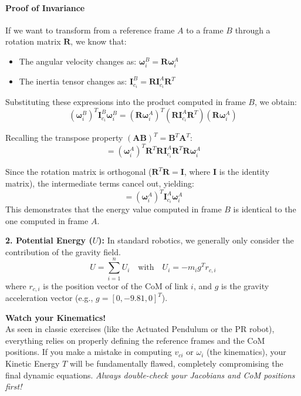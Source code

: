 \documentclass[11pt,a4paper]{article}
\begin{document}
\paragraph*{Proof of Invariance}
If we want to transform from a reference frame $A$ to a frame $B$ through a rotation matrix $\boldsymbol{R}$, we know that:
\begin{itemize}
    \item The angular velocity changes as: $\boldsymbol{\omega}_i^B = \boldsymbol{R} \boldsymbol{\omega}_i^A$
    \item The inertia tensor changes as: $\boldsymbol{I}_{c_i}^B = \boldsymbol{R} \boldsymbol{I}_{c_i}^A \boldsymbol{R}^T$
\end{itemize}

Substituting these expressions into the product computed in frame $B$, we obtain:
\begin{equation}
    (\boldsymbol{\omega}_i^B)^T \boldsymbol{I}_{c_i}^B \boldsymbol{\omega}_i^B = (\boldsymbol{R} \boldsymbol{\omega}_i^A)^T (\boldsymbol{R} \boldsymbol{I}_{c_i}^A \boldsymbol{R}^T) (\boldsymbol{R} \boldsymbol{\omega}_i^A)
\end{equation}

Recalling the transpose property $(\boldsymbol{A}\boldsymbol{B})^T = \boldsymbol{B}^T \boldsymbol{A}^T$:
\begin{equation}
    = (\boldsymbol{\omega}_i^A)^T \boldsymbol{R}^T \boldsymbol{R} \boldsymbol{I}_{c_i}^A \boldsymbol{R}^T \boldsymbol{R} \boldsymbol{\omega}_i^A
\end{equation}

Since the rotation matrix is orthogonal ($\boldsymbol{R}^T \boldsymbol{R} = \boldsymbol{I}$, where $\boldsymbol{I}$ is the identity matrix), the intermediate terms cancel out, yielding:
\begin{equation}
    = (\boldsymbol{\omega}_i^A)^T \boldsymbol{I}_{c_i}^A \boldsymbol{\omega}_i^A
\end{equation}
This demonstrates that the energy value computed in frame $B$ is identical to the one computed in frame $A$.

\vspace{0.5cm}

\textbf{2. Potential Energy ($U$):}
In standard robotics, we generally only consider the contribution of the gravity field. 
\begin{equation}
    U = \sum_{i=1}^{n} U_i \quad \text{with} \quad U_i = -m_i g^T r_{c,i}
\end{equation}
where $r_{c,i}$ is the position vector of the CoM of link $i$, and $g$ is the gravity acceleration vector (e.g., $g = [0, -9.81, 0]^T$).
\begin{examtip}
\textbf{Watch your Kinematics!}\\
As seen in classic exercises (like the Actuated Pendulum or the PR robot), everything relies on properly defining the reference frames and the CoM positions. If you make a mistake in computing $v_{ci}$ or $\omega_i$ (the kinematics), your Kinetic Energy $T$ will be fundamentally flawed, completely compromising the final dynamic equations. \textit{Always double-check your Jacobians and CoM positions first!}
\end{examtip}
\end{document}
